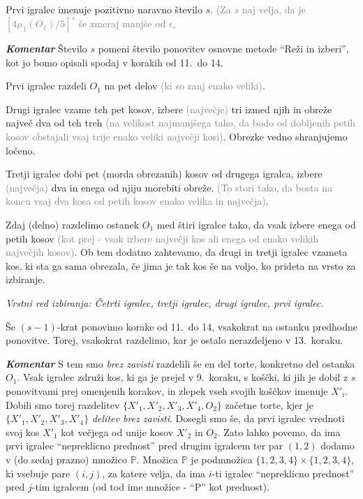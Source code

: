 \documentclass[a4paper,12pt]{article}
\def\P{\mathbb{P}}
\begin{document}
\begin{protokol}
\item Prvi igralec imenuje pozitivno naravno število $s$. \textcolor{gray}{(Za $s$ naj velja, da je $[4\mu_1(O_1)/5]^s$ še zmeraj manjše od $\epsilon$}. 

\item [\textbf{\em Komentar}] Število $s$ pomeni število ponovitev osnovne metode ``Reži in izberi'', kot jo bomo opisali spodaj v korakih od 11.~do 14.


\item Prvi igralec razdeli $O_1$ na pet delov \textcolor{gray}{(ki so zanj enako veliki)}.

\item Drugi igralec vzame teh pet kosov, izbere \textcolor{gray}{(največje)} tri izmed njih in obreže največ dva od teh treh \textcolor{gray}{(na velikost najmanjšega tako, da bodo od dobljenih petih kosov obstajali vsaj trije enako veliki največji kosi)}. Obrezke vedno shranjujemo ločeno.

\item Tretji igralec dobi pet (morda obrezanih) kosov od drugega igralca, izbere \textcolor{gray}{(največja)} dva in enega od njiju morebiti obreže. \textcolor{gray}{(To stori tako, da bosta na koncu vsaj dva kosa od petih kosov enako velika in največja)}.

\item Zdaj (delno) razdelimo ostanek $O_1$ med štiri igralce tako, da vsak izbere enega od petih kosov \textcolor{gray}{(kot prej - vsak izbere največji kos ali enega od enako velikih največjih kosov)}. Ob tem dodatno zahtevamo, da drugi in tretji igralec vzameta kos, ki sta ga sama obrezala, če jima je tak kos še na voljo, ko prideta na vrsto za izbiranje.

\textsl{Vrstni red izbiranja: Četrti igralec, tretji igralec, drugi igralec, prvi igralec.}

\item Še $(s - 1)$-krat ponovimo korake od 11.~do 14, vsakokrat na ostanku predhodne ponovitve. Torej, vsakokrat razdelimo, kar je ostalo nerazdeljeno v 13.~koraku.

\item [\textbf{\em Komentar}]  S tem smo {\em brez zavisti} razdelili še en del torte, konkretno del ostanka $O_1$. Vsak igralec združi kos, ki ga je prejel v 9.~koraku, s koščki, ki jih je dobil z $s$ ponovitvami prej omenjenih korakov, in zlepek vseh svojih koščkov imenuje $X'_i$. Dobili smo torej razdelitev ${\{X'_1, X'_2, X'_3, X'_4, O_2\}}$ začetne torte, kjer je ${\{X'_1, X'_2, X'_3, X'_4\}}$ {\em delitev brez zavisti}. Dosegli smo še, da prvi igralec vrednoti svoj kos $X'_1$ kot večjega od unije kosov $X'_2$ in $O_2$. Zato lahko povemo, da ima prvi igralec ``nepreklicno prednost'' pred drugim igralcem ter par $(1,2)$ dodamo v (do sedaj prazno) množico $\P$. Množica $\P$ je podmnožica ${\{1, 2, 3, 4\}} \times {\{1, 2, 3, 4\}}$, ki vsebuje pare $(i, j)$, za katere velja, da ima $i$-ti igralec ``nepreklicno prednost'' pred $j$-tim igralcem (od tod ime množice - ``P'' kot prednost).


\end{protokol}
\end{document}
